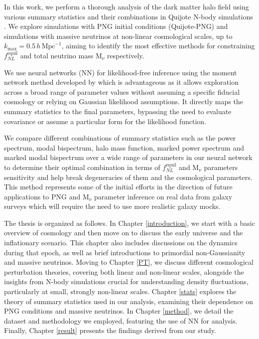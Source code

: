 In this work, we perform a thorough analysis of the dark matter halo field using various summary statistics and their combinations in Quijote N-body simulations \cite{Villaescusa_Navarro_2020}. We explore simulations with PNG initial conditions (Quijote-PNG) \cite{Coulton_2023} and simulations with massive neutrinos at non-linear cosmological scales, up to $k_{\mathrm{max}} = 0.5 \, h \, \mathrm{Mpc}^{-1}$, aiming to identify the most effective methods for constraining $f_{NL}^{\mathrm{equil}}$  and total neutrino mass $\mathrm{M}_{\nu}$ respectively.

We use neural networks (NN) for likelihood-free inference using the moment network method developed by \cite{jeffrey2020solvinghighdimensionalparameterinference} which is advantageous as it allows exploration across a broad range of parameter values without assuming a specific fiducial cosmology or relying on Gaussian likelihood assumptions. It directly maps the summary statistics to the final parameters, bypassing the need to evaluate covariance or assume a particular form for the likelihood function.

We compare different combinations of summary statistics such as the power spectrum, modal bispectrum, halo mass function, marked power spectrum and marked modal bispectrum over a wide range of parameters in our neural network to determine their optimal combination in terms of $f_{NL}^{\mathrm{equil}}$ and $\mathrm{M}_{\nu}$  parameters sensitivity and help break degeneracies of them and the cosmological parameters. This method represents some of the initial efforts in the direction of future applications to PNG and $\mathrm{M}_{\nu}$  parameter inference on real data from galaxy surveys which will require the need to use more realistic galaxy mocks.

The thesis is organized as follows. In Chapter \ref{introduction}, we start with a basic overview of cosmology and then move on to discuss the early universe and the inflationary scenario. This chapter also includes discussions on the dynamics during that epoch, as well as brief introductions to primordial non-Gaussianity and massive neutrinos. Moving to Chapter \ref{PT}, we discuss different cosmological perturbation theories, covering both linear and non-linear scales, alongside the insights from N-body simulations crucial for understanding density fluctuations, particularly at small, strongly non-linear scales. Chapter \ref{stats} explores the theory of summary statistics used in our analysis, examining their dependence on PNG conditions and massive neutrinos. In Chapter \ref{method}, we detail the dataset and methodology we employed, featuring the use of NN for analysis. Finally, Chapter \ref{result} presents the findings derived from our study.